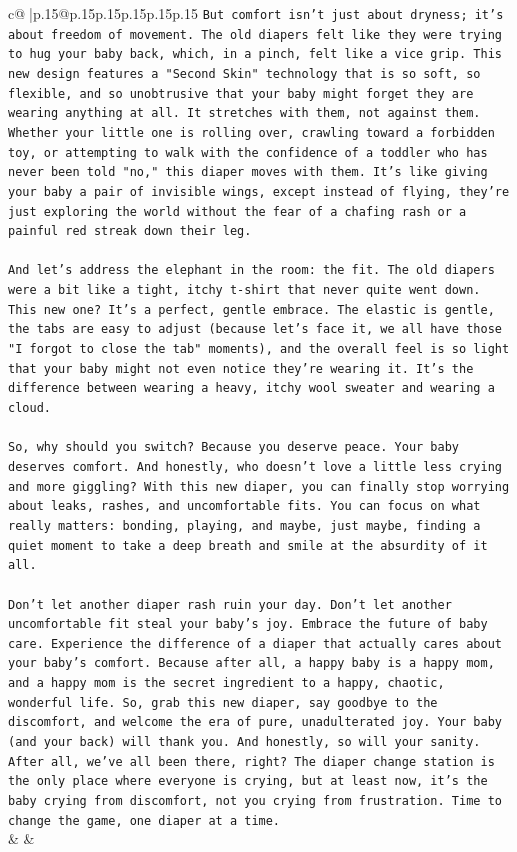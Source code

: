 \documentclass{article}
\begin{document}
{\begin{supertabular}{c@{$\;$}|p{.15\linewidth}@{}p{.15\linewidth}p{.15\linewidth}p{.15\linewidth}p{.15\linewidth}p{.15\linewidth}}
{{{\texttt{But comfort isn't just about dryness; it's about freedom of movement. The old diapers felt like they were trying to hug your baby back, which, in a pinch, felt like a vice grip. This new design features a "Second Skin" technology that is so soft, so flexible, and so unobtrusive that your baby might forget they are wearing anything at all. It stretches with them, not against them. Whether your little one is rolling over, crawling toward a forbidden toy, or attempting to walk with the confidence of a toddler who has never been told "no," this diaper moves with them. It's like giving your baby a pair of invisible wings, except instead of flying, they're just exploring the world without the fear of a chafing rash or a painful red streak down their leg.} \\
\\ 
\texttt{And let's address the elephant in the room: the fit. The old diapers were a bit like a tight, itchy t{-}shirt that never quite went down. This new one? It's a perfect, gentle embrace. The elastic is gentle, the tabs are easy to adjust (because let's face it, we all have those "I forgot to close the tab" moments), and the overall feel is so light that your baby might not even notice they're wearing it. It's the difference between wearing a heavy, itchy wool sweater and wearing a cloud.} \\
\\ 
\texttt{So, why should you switch? Because you deserve peace. Your baby deserves comfort. And honestly, who doesn't love a little less crying and more giggling? With this new diaper, you can finally stop worrying about leaks, rashes, and uncomfortable fits. You can focus on what really matters: bonding, playing, and maybe, just maybe, finding a quiet moment to take a deep breath and smile at the absurdity of it all.} \\
\\ 
\texttt{Don't let another diaper rash ruin your day. Don't let another uncomfortable fit steal your baby's joy. Embrace the future of baby care. Experience the difference of a diaper that actually cares about your baby's comfort. Because after all, a happy baby is a happy mom, and a happy mom is the secret ingredient to a happy, chaotic, wonderful life. So, grab this new diaper, say goodbye to the discomfort, and welcome the era of pure, unadulterated joy. Your baby (and your back) will thank you. And honestly, so will your sanity. After all, we've all been there, right? The diaper change station is the only place where everyone is crying, but at least now, it's the baby crying from discomfort, not you crying from frustration. Time to change the game, one diaper at a time.} \\
            }
        }
    }
    & & \\ \\


\end{supertabular}}
\end{document}

